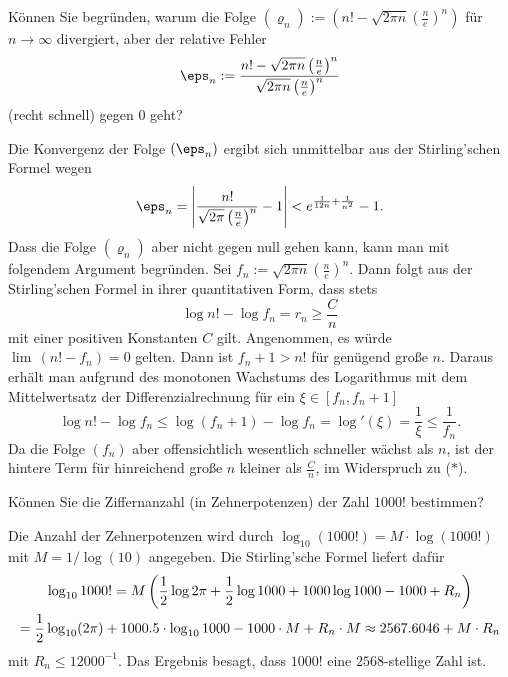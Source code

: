   \begin{frage}
    Können Sie begründen, warum die Folge 
    $(\varrho_n) := 
    \left( n!- \sqrt{2\pi n}\left( \frac{n}{e} \right)^n 
    \right)$ 
    für $n\to \infty$ divergiert, aber 
    der relative Fehler 
    \[
    \eps_n := \frac{n!-\sqrt{2\pi n} \left( \frac{n}{e} \right)^n }{
      \sqrt{2\pi n} \left( \frac{n}{e} \right)^n }
    \]
    (recht schnell) gegen $0$ geht?
  \end{frage}

  \begin{antwort}
    Die Konvergenz der Folge 
    $(\eps_n)$ ergibt sich unmittelbar aus der Stirling'schen 
    Formel wegen 
    \[
    \eps_n  = \left| \frac{n!}{ \sqrt{2\pi} \left(\frac{n}{e} \right)^n } 
      -1 \right| < e^{\frac{1}{12n}+ \frac{1}{n^2}} -1.
    \]
    Dass die Folge $(\varrho_n)$ aber nicht gegen null 
    gehen kann, kann man mit folgendem Argument begründen. Sei  
    $f_n:= \sqrt{2\pi n} \left( \frac{n}{e} \right)^n$. 
    Dann folgt aus der Stirling'schen Formel in ihrer quantitativen 
    Form, dass stets
    \begin{equation}
      \log n! - \log f_n =r_n \ge \frac{C}{n}
      \tag{$\ast$}
    \end{equation}
    mit einer positiven Konstanten $C$ gilt.
    Angenommen, es würde $\lim\, (n! - f_n)=0$ gelten. 
    Dann ist $f_n+1> n!$ für genügend große $n$. 
    Daraus erhält man aufgrund des 
    monotonen Wachstums des Logarithmus mit dem 
    Mittelwertsatz der Differenzialrechnung für ein 
    $\xi\in [f_n, f_n+1 ]$
    \[
    \log n! - \log f_n \le 
    \log( f_n+1 )- \log f_n = \log'( \xi ) =   
    \frac{1}{\xi}  \le \frac{1}{ f_n }. 
    \]
    Da die Folge $(f_n)$ aber offensichtlich wesentlich schneller wächst 
    als $n$, ist der hintere Term für hinreichend große $n$ kleiner 
    als $\frac{C}{n}$, im Widerspruch zu ($\ast$).\AntEnd   
  \end{antwort}

  \begin{frage}
    Können Sie die Ziffernanzahl (in Zehnerpotenzen) der Zahl $1000!$ bestimmen?
  \end{frage}

  \begin{antwort}
    Die Anzahl der Zehnerpotenzen wird durch 
    $\log_{10}( 1000! )= M \cdot \log(1000!)$ 
    mit $M=1/\log(10)$ angegeben. Die Stirling'sche Formel liefert dafür 
    \begin{multline}
      \log_{10} 1000! =  M \left( \frac{1}{2}\log 2\pi + 
        \frac{1}{2}\log 1000 + 1000\log 1000 - 1000 + R_n \right) \\ 
      = 
      \frac{1}{2}\log_{10} (2\pi)+ 1000.5 \cdot \log_{10} 1000 
      - 1000 \cdot M + R_n \cdot M 
      \approx 2567.6046+ M\cdot R_n
      \notag
    \end{multline}
    mit $R_n \le 12000^{-1}$. Das Ergebnis besagt, 
    dass $1000!$ eine $2568$-stellige Zahl ist.
    \AntEnd 
  \end{antwort}

